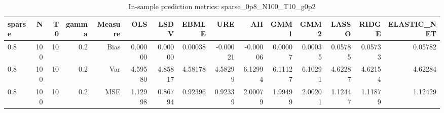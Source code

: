 \begin{table}[!htbp]\centering
\caption{In-sample prediction metrics: sparse_0p8_N100_T10_g0p2}
\label{tab:table2_sparse_0p8_N100_T10_g0p2}
\begin{tabular}{lrrrrrrrrrrrrrr}
\hline
sparse & N & T0 & gamma & Measure & OLS & LSDV & EBMLE & URE & AH & GMM1 & GMM2 & LASSO & RIDGE & ELASTIC_NET \\
\hline
0.8 & 100 & 10 & 0.2 & Bias & 0.00000 & 0.00000 & 0.00038 & -0.00021 & -0.00006 & 0.00007 & 0.00035 & 0.05785 & 0.05733 & 0.05782 \\
0.8 & 100 & 10 & 0.2 & Var & 4.59580 & 4.85817 & 4.58178 & 4.58299 & 6.12994 & 6.11127 & 6.10291 & 4.62287 & 4.62154 & 4.62284 \\
0.8 & 100 & 10 & 0.2 & MSE & 1.12998 & 0.86794 & 0.92396 & 0.92339 & 2.00079 & 1.99499 & 2.00201 & 1.12447 & 1.11879 & 1.12429 \\
\hline
\end{tabular}
\end{table}


